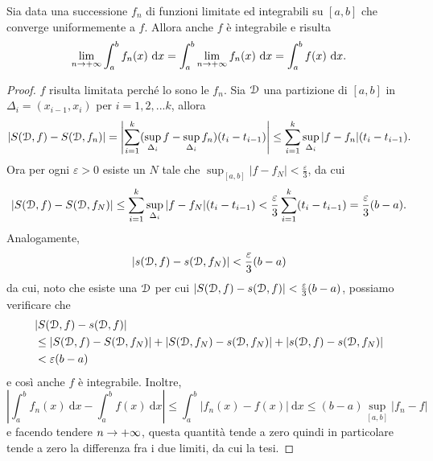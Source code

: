 \documentclass[Completo.tex]{subfiles}
\begin{document}
\begin{eTh}[integrabilita']
	Sia data una successione $f_n$ di funzioni limitate ed integrabili su $[a,b]$ che converge uniformemente a $f$. Allora anche $f$ è integrabile e risulta
	\begin{equation*}
	\lim_{n \ra +\infty} \int_{a}^{b} f_n(x) \ \mathrm{d}x = \int_{a}^{b} \lim_{n \ra +\infty} f_n(x) \ \mathrm{d}x = \int_{a}^{b} f(x) \ \mathrm{d}x.
	\end{equation*}
\end{eTh}
\begin{proof}
	$f$ risulta limitata perché lo sono le $f_n$. Sia $\eu[D]$ una partizione di $[a,b]$ in $\Delta_i = (x_{i-1}, x_i)$ per $i = 1, 2, ... k$, allora
	\begin{equation*}
		\vert S(\eu[D], f) - S(\eu[D], f_n) \vert = \left\vert \sum_{i = 1}^{k} (\sup_{\Delta_i} f - \sup_{\Delta_i} f_n)(t_i - t_{i-1})\right\vert \leq \sum_{i = 1}^{k} \sup_{\Delta_i} \vert f-f_n \vert (t_i - t_{i-1}).
	\end{equation*}
	Ora per ogni $\varepsilon > 0$ esiste un $N$ tale che $\sup_{[a,b]} \vert f-f_N \vert < \frac{\varepsilon}{3}$, da cui
	\begin{equation*}
	\vert S(\eu[D], f) - S(\eu[D], f_N) \vert \leq \sum_{i = 1}^{k} \sup_{\Delta_i} \vert f-f_N \vert (t_i - t_{i-1}) < \frac{\varepsilon}{3} \sum_{i = 1}^{k} (t_i - t_{i-1}) = \frac{\varepsilon}{3}(b-a).
	\end{equation*}
	Analogamente,
	\begin{equation*}
	\vert s(\eu[D], f) - s(\eu[D], f_N) \vert < \frac{\varepsilon}{3} (b-a)
	\end{equation*}
	da cui, noto che esiste una $\eu[D]$ per cui $\vert S(\eu[D], f) - s(\eu[D], f) \vert < \frac{\varepsilon}{3}(b-a)$, possiamo verificare che
	\begin{align*}
	& \vert S(\eu[D], f) - s(\eu[D], f) \vert \\
	& \leq \vert S(\eu[D], f) - S(\eu[D], f_N) \vert + \vert S(\eu[D], f_N) - s(\eu[D], f_N) \vert + \vert s(\eu[D], f) - s(\eu[D], f_N) \vert \\
	& < \varepsilon (b-a)
	\end{align*}
	e così anche $f$ è integrabile. Inoltre,
	\begin{equation*}
	\left\vert \int_{a}^{b} f_n(x) \ \mathrm{d}x - \int_{a}^{b} f(x) \ \mathrm{d}x \right\vert \leq \int_{a}^{b} \vert f_n(x) - f(x) \vert \ \mathrm{d}x \leq (b-a) \sup_{[a,b]} \vert f_n - f \vert
	\end{equation*}
	e facendo tendere $n \rightarrow +\infty$, questa quantità tende a zero quindi in particolare tende a zero la differenza fra i due limiti, da cui la tesi.
\end{proof}
\end{document}
